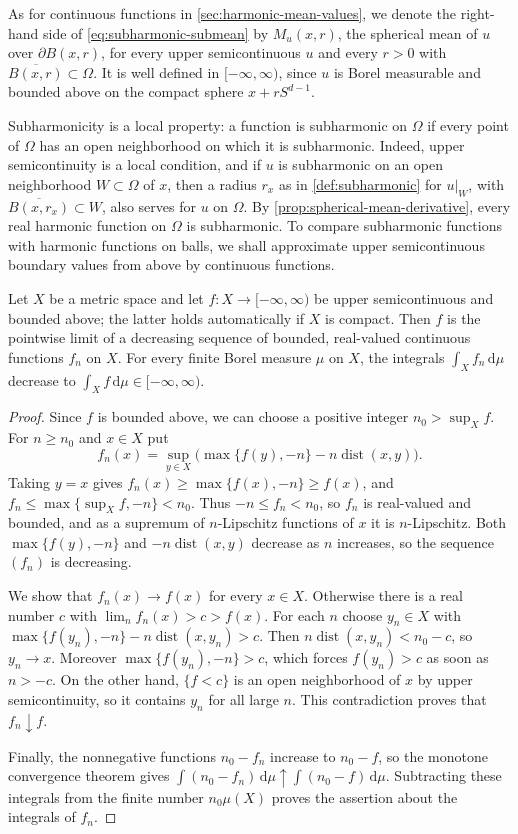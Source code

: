 As for continuous functions in \cref{sec:harmonic-mean-values}, we denote the right-hand side of \eqref{eq:subharmonic-submean} by $M_u(x,r)$, the spherical mean of $u$ over $\partial B(x,r)$, for every upper semicontinuous $u$ and every $r>0$ with $\overline{B(x,r)}\subset\Omega$. It is well defined in $[-\infty,\infty)$, since $u$ is Borel measurable and bounded above on the compact sphere $x+rS^{d-1}$.

Subharmonicity is a local property: a function is subharmonic on $\Omega$ if every point of $\Omega$ has an open neighborhood on which it is subharmonic. Indeed, upper semicontinuity is a local condition, and if $u$ is subharmonic on an open neighborhood $W\subset\Omega$ of $x$, then a radius $r_x$ as in \cref{def:subharmonic} for $u|_W$, with $\overline{B(x,r_x)}\subset W$, also serves for $u$ on $\Omega$. By \cref{prop:spherical-mean-derivative}, every real harmonic function on $\Omega$ is subharmonic. To compare subharmonic functions with harmonic functions on balls, we shall approximate upper semicontinuous boundary values from above by continuous functions.

\begin{lemma}\label{lem:usc-majorants}
Let $X$ be a metric space and let $f\colon X\to[-\infty,\infty)$ be upper semicontinuous and bounded above; the latter holds automatically if $X$ is compact. Then $f$ is the pointwise limit of a decreasing sequence of bounded, real-valued continuous functions $f_n$ on $X$. For every finite Borel measure $\mu$ on $X$, the integrals $\int_Xf_n\,\mathrm d\mu$ decrease to $\int_Xf\,\mathrm d\mu\in[-\infty,\infty)$.
\end{lemma}
\begin{proof}
Since $f$ is bounded above, we can choose a positive integer $n_0>\sup_Xf$. For $n\geq n_0$ and $x\in X$ put
\[
 f_n(x)=\sup_{y\in X}\bigl(\max\{f(y),-n\}-n\operatorname{dist}(x,y)\bigr).
\]
Taking $y=x$ gives $f_n(x)\geq\max\{f(x),-n\}\geq f(x)$, and $f_n\leq\max\{\sup_Xf,-n\}<n_0$. Thus $-n\leq f_n<n_0$, so $f_n$ is real-valued and bounded, and as a supremum of $n$-Lipschitz functions of $x$ it is $n$-Lipschitz. Both $\max\{f(y),-n\}$ and $-n\operatorname{dist}(x,y)$ decrease as $n$ increases, so the sequence $(f_n)$ is decreasing.

We show that $f_n(x)\to f(x)$ for every $x\in X$. Otherwise there is a real number $c$ with $\lim_nf_n(x)>c>f(x)$. For each $n$ choose $y_n\in X$ with $\max\{f(y_n),-n\}-n\operatorname{dist}(x,y_n)>c$. Then $n\operatorname{dist}(x,y_n)<n_0-c$, so $y_n\to x$. Moreover $\max\{f(y_n),-n\}>c$, which forces $f(y_n)>c$ as soon as $n>-c$. On the other hand, $\{f<c\}$ is an open neighborhood of $x$ by upper semicontinuity, so it contains $y_n$ for all large $n$. This contradiction proves that $f_n\downarrow f$.

Finally, the nonnegative functions $n_0-f_n$ increase to $n_0-f$, so the monotone convergence theorem gives $\int(n_0-f_n)\,\mathrm d\mu\uparrow\int(n_0-f)\,\mathrm d\mu$. Subtracting these integrals from the finite number $n_0\mu(X)$ proves the assertion about the integrals of $f_n$.
\end{proof}

